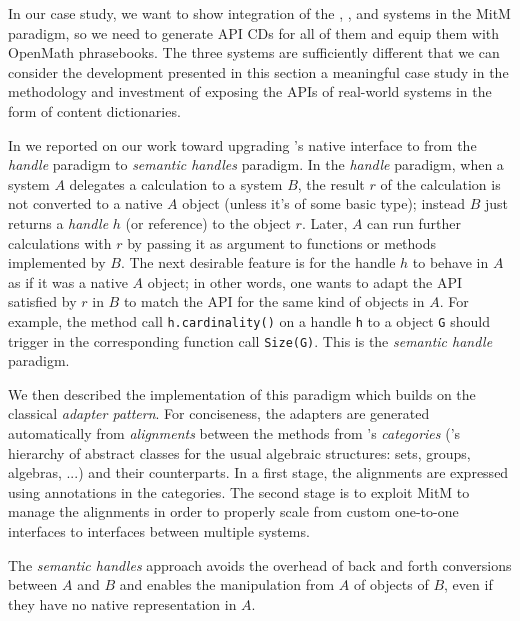 In our case study, we want to show integration of the \GAP, \Singular, and \Sage systems
in the MitM paradigm, so we need to generate API CDs for all of them and equip them with
OpenMath phrasebooks. The three systems are sufficiently different that we can consider
the development presented in this section a meaningful case study in the methodology and
investment of exposing the APIs of real-world systems in the form of \OMMT content
dictionaries.


In \cite{DehKohKon:iop16} we reported on our work toward upgrading
\Sage's native interface to \GAP from the \emph{handle} paradigm to
\emph{semantic handles} paradigm. In the \emph{handle} paradigm, when
a system $A$ delegates a calculation to a system $B$, the result $r$
of the calculation is not converted to a native $A$ object (unless
it's of some basic type); instead $B$ just returns a \emph{handle} $h$
(or reference) to the object $r$. Later, $A$ can run further
calculations with $r$ by passing it as argument to functions or
methods implemented by $B$. The next desirable feature is for the
handle $h$ to behave in $A$ as if it was a native $A$ object; in other
words, one wants to adapt the API satisfied by $r$ in $B$ to match the
API for the same kind of objects in $A$. For example, the method call
\texttt{h.cardinality()} on a \Sage handle \texttt{h} to a \GAP object
\texttt{G} should trigger in \GAP the corresponding function call
\texttt{Size(G)}. This is the \emph{semantic handle} paradigm.

We then described the implementation of this paradigm which builds on
the classical \emph{adapter pattern}. For conciseness, the adapters
are generated automatically from \emph{alignments} between the methods
from \Sage's \emph{categories} (\Sage's hierarchy of abstract classes
for the usual algebraic structures: sets, groups, algebras, ...) and
their \GAP counterparts. In a first stage, the alignments are expressed
using annotations in the \Sage categories. The second stage is to
exploit MitM to manage the alignments in order to properly scale from
custom one-to-one interfaces to interfaces between multiple systems.

The \emph{semantic handles} approach avoids the overhead of back and
forth conversions between $A$ and $B$ and enables the manipulation
from $A$ of objects of $B$, even if they have no native representation
in $A$.

